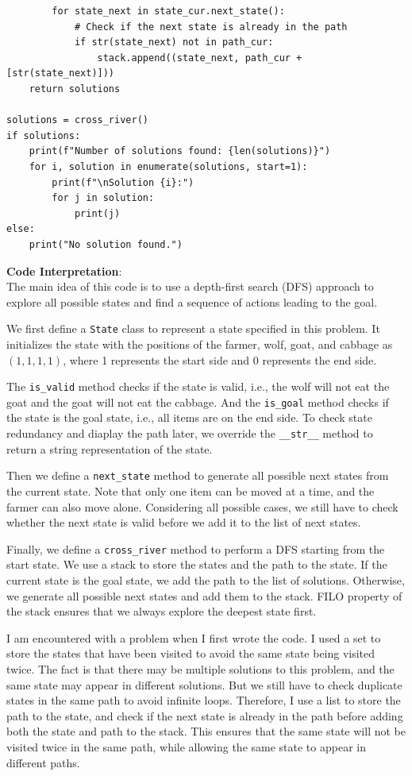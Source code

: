 \documentclass[UTF8]{ctexart}
\begin{document}
\begin{lstlisting}
        for state_next in state_cur.next_state():
            # Check if the next state is already in the path
            if str(state_next) not in path_cur:
                stack.append((state_next, path_cur + [str(state_next)]))
    return solutions

solutions = cross_river()
if solutions:
    print(f"Number of solutions found: {len(solutions)}")
    for i, solution in enumerate(solutions, start=1):
        print(f"\nSolution {i}:")
        for j in solution:
            print(j)
else:
    print("No solution found.")
\end{lstlisting}
\textbf{\large Code Interpretation}:\\
The main idea of this code is to use a depth-first search (DFS) approach to explore all possible states
and find a sequence of actions leading to the goal.

We first define a \texttt{State} class to represent a state specified in this problem.
It initializes the state with the positions of the farmer, wolf, goat, and cabbage as $(1,1,1,1)$, where 1 represents the start side and 0 represents the end side.

The \texttt{is\_valid} method checks if the state is valid, i.e., the wolf will not eat the goat and the goat will not eat the cabbage.
And the \texttt{is\_goal} method checks if the state is the goal state, i.e., all items are on the end side.
To check state redundancy and diaplay the path later, we override the \texttt{\_\_str\_\_} method to return a string representation of the state.

Then we define a \texttt{next\_state} method to generate all possible next states from the current state.
Note that only one item can be moved at a time, and the farmer can also move alone. Considering all possible cases, we still have to check
whether the next state is valid before we add it to the list of next states.

Finally, we define a \texttt{cross\_river} method to perform a DFS starting from the start state. We use a stack to store the states and the path to the state.
If the current state is the goal state, we add the path to the list of solutions. Otherwise, we generate all possible next states and add them to the stack.
FILO property of the stack ensures that we always explore the deepest state first.

I am encountered with a problem when I first wrote the code. I used a set to store the states that have been visited to avoid the same state being visited twice.
The fact is that there may be multiple solutions to this problem, and the same state may appear in different solutions. But we still have to check duplicate states in the same path to avoid infinite loops.
Therefore, I use a list to store the path to the state, and check if the next state is already in the path before adding both the state and path to the stack. This ensures that the same state will not be visited twice in the same path,
while allowing the same state to appear in different paths.
\end{document}
